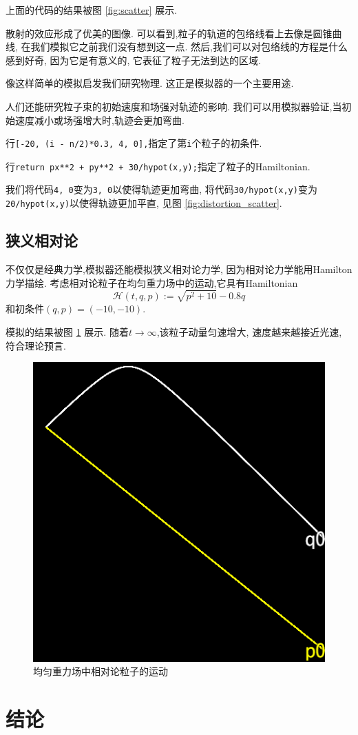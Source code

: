 \documentclass[12pt]{article}
\begin{document}
上面的代码的结果被图 \ref{fig:scatter} 展示.

散射的效应形成了优美的图像.
可以看到,粒子的轨道的包络线看上去像是圆锥曲线,
在我们模拟它之前我们没有想到这一点.
然后,我们可以对包络线的方程是什么感到好奇,
因为它是有意义的,
它表征了粒子无法到达的区域.

像这样简单的模拟启发我们研究物理.
这正是模拟器的一个主要用途.

人们还能研究粒子束的初始速度和场强对轨迹的影响.
我们可以用模拟器验证,当初始速度减小或场强增大时,轨迹会更加弯曲.

行\texttt{[-20, (i - n/2)*0.3, 4, 0],}指定了第\texttt{i}个粒子的初条件.

行\texttt{return px**2 + py**2 + 30/hypot(x,y);}指定了粒子的Hamiltonian.

我们将代码\texttt{4, 0}变为\texttt{3, 0}以使得轨迹更加弯曲,
将代码\texttt{30/hypot(x,y)}变为\texttt{20/hypot(x,y)}以使得轨迹更加平直,
见图 \ref{fig:distortion_scatter}.

\subsection{狭义相对论}

不仅仅是经典力学,模拟器还能模拟狭义相对论力学,
因为相对论力学能用Hamilton力学描绘.
考虑相对论粒子在均匀重力场中的运动,它具有Hamiltonian\cite[p. 28]{landau2010fields}
\begin{equation*}
  \mathcal H\left(t,q,p\right):=\sqrt{p^2+10}-0.8q
\end{equation*}
和初条件$\left(q,p\right)=\left(-10,-10\right)$.

模拟的结果被图 \ref{fig:relativity} 展示.
随着$t\rightarrow\infty$,该粒子动量匀速增大,
速度越来越接近光速,
符合理论预言\cite[p. 24]{landau2010fields}.

\begin{figure}[h]
  \centering
  \includegraphics[width=0.25\linewidth]{relativity_gravity.png}
  \caption{均匀重力场中相对论粒子的运动}
  \label{fig:relativity}
\end{figure}

\section{结论}
\end{document}
